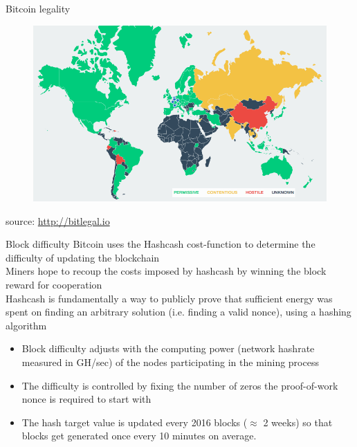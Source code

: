 \documentclass[11pt]{beamer}
\begin{document}
\begin{frame}{Bitcoin legality}
	\begin{figure}[]
		\centering
		\includegraphics  [scale=0.3]{Images/bitlegal}
	\end{figure}
		\begin{scriptsize}
		source: \href{http://bitlegal.io}{http://bitlegal.io}
	\end{scriptsize}
\end{frame}


\begin{frame}{Block difficulty}
	Bitcoin uses the Hashcash cost-function to determine the difficulty of updating the blockchain \\ \vspace{3mm}
	Miners hope to recoup the costs imposed by hashcash by winning the block reward for cooperation \\ \vspace{3mm}
	Hashcash is fundamentally a way to publicly prove that sufficient energy was spent on finding an arbitrary solution (i.e. finding a valid nonce), using a hashing algorithm
	\begin{itemize}
		\item Block difficulty adjusts with the computing power (network hashrate measured in GH/sec) of the nodes participating in the mining process
		\item The difficulty is controlled by fixing the number of zeros the proof-of-work nonce is required to start with
		\item The hash target value is updated every 2016 blocks ($\approx$ 2 weeks) so that blocks get generated once every 10 minutes on average.
	\end{itemize}
\end{frame}
\end{document}
